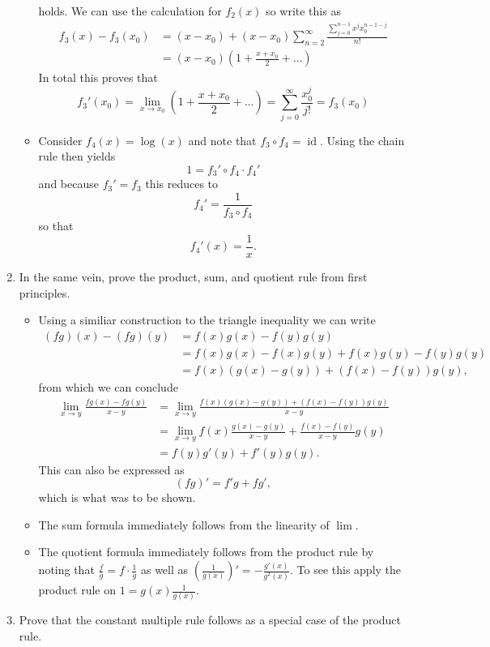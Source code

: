 \documentclass{article}
\begin{document}
\begin{enumerate}
\begin{itemize}
	holds. We can use the calculation for $f_2(x)$ so write this as
	\begin{align*}
	f_3(x) - f_3(x_0) &= (x - x_0) + (x - x_0) \sum_{n = 2}^\infty \frac{\sum_{j = 0}^{n - 1} x^j x_0^{n - 1 - j}}{n!} \\
	&= (x - x_0) \left(1 + \frac{x + x_0}{2} + \dots \right)
	\end{align*}
	In total this proves that
	$$
	f_3'(x_0) = \lim_{x \rightarrow x_0} \left(1 + \frac{x + x_0}{2} + \dots \right) = \sum_{j = 0}^\infty \frac{x_0^j}{j!} = f_3(x_0)
	$$
	\item Consider $f_4(x) = \log(x)$ and note that $f_3 \circ f_4 = \operatorname{id}$. Using the chain rule then yields
	$$
	1 = f_3' \circ f_4 \cdot f_4'
	$$
	and because $f_3' = f_3$ this reduces to
	$$
	f_4' = \frac{1}{f_3 \circ f_4}
	$$
	so that
	$$
	f_4'(x) = \frac{1}{x}.
	$$
	\end{itemize}
\item In the same vein, prove the product, sum, and quotient rule from first principles.
	\begin{itemize}
	\item Using a similiar construction to the triangle inequality we can write
	\begin{align*}
	(fg)(x) - (fg)(y) &= f(x)g(x) - f(y)g(y) \\
	&= f(x)g(x) - f(x)g(y) + f(x)g(y) - f(y)g(y) \\
	&= f(x)(g(x) - g(y)) + (f(x) - f(y))g(y),
	\end{align*}
	from which we can conclude
	\begin{align*}
	\lim_{x \rightarrow y} \frac{fg(x) - fg(y)}{x - y} &= \lim_{x \rightarrow y} \frac{f(x)(g(x) - g(y)) + (f(x) - f(y))g(y)}{x - y} \\
	&= \lim_{x \rightarrow y} f(x) \frac{g(x) - g(y)}{x - y} + \frac{f(x) - f(y)}{x - y} g(y) \\
	&= f(y) g'(y) + f'(y)g(y).
	\end{align*}
	This can also be expressed as
	$$
	(fg)' = f'g + fg',
	$$
	which is what was to be shown.
	\item The sum formula immediately follows from the linearity of $\lim$.
	\item The quotient formula immediately follows from the product rule by noting that $\frac{f}{g} = f \cdot \frac{1}{g}$ as well as $\left(\frac{1}{g(x)}\right)' = -\frac{g'(x)}{g^2(x)}$. To see this apply the product rule on $1 = g(x) \frac{1}{g(x)}$.
	\end{itemize}
\item Prove that the constant multiple rule follows as a special case of the product rule.

\end{enumerate}
\end{document}
